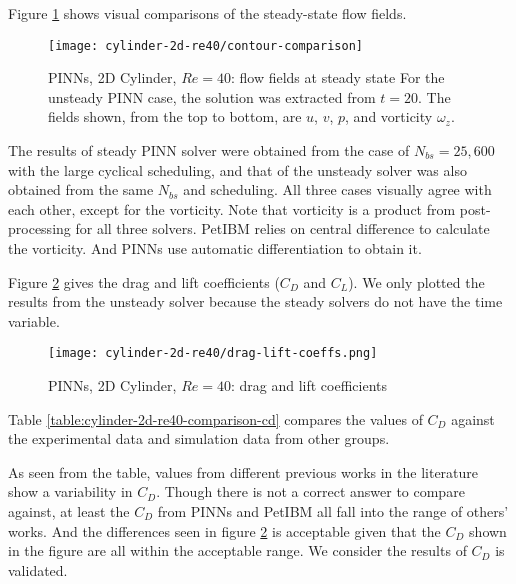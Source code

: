 Figure \ref{fig:cylinder-2d-re40-contours} shows visual comparisons of the steady-state flow fields.
\begin{figure}[hbt!]
    \texttt{[image: cylinder-2d-re40/contour-comparison]}
    \caption[
        PINNs, 2D Cylinder, $Re=40$: flow fields at steady state%
    ]{%
        PINNs, 2D Cylinder, $Re=40$: flow fields at steady state%
        For the unsteady PINN case, the solution was extracted from $t=20$.
        The fields shown, from the top to bottom, are $u$, $v$, $p$, and vorticity $\omega_z$.
    }%
    \label{fig:cylinder-2d-re40-contours}
\end{figure}
The results of steady PINN solver were obtained from the case of $N_{bs}=25,600$ with the large cyclical scheduling, and that of the unsteady solver was also obtained from the same $N_{bs}$ and scheduling.
All three cases visually agree with each other, except for the vorticity.
Note that vorticity is a product from post-processing for all three solvers.
PetIBM relies on central difference to calculate the vorticity.
And PINNs use automatic differentiation to obtain it.

Figure \ref{fig:cylinder-2d-re40-drag-lift-time} gives the drag and lift coefficients ($C_D$ and $C_L$).
We only plotted the results from the unsteady solver because the steady solvers do not have the time variable. 
\begin{figure}[hbt!]
    \texttt{[image: cylinder-2d-re40/drag-lift-coeffs.png]}
    \caption[
        PINNs, 2D Cylinder, $Re=40$: drag and lift coefficients%
    ]{%
        PINNs, 2D Cylinder, $Re=40$: drag and lift coefficients%
    }%
    \label{fig:cylinder-2d-re40-drag-lift-time}
\end{figure}
Table \ref{table:cylinder-2d-re40-comparison-cd} compares the values of $C_D$ against the experimental data and simulation data from other groups.

As seen from the table, values from different previous works in the literature show a variability in $C_D$.
Though there is not a correct answer to compare against, at least the $C_D$ from PINNs and PetIBM all fall into the range of others' works.
And the differences seen in figure \ref{fig:cylinder-2d-re40-drag-lift-time} is acceptable given that the $C_D$ shown in the figure are all within the acceptable range.
We consider the results of $C_D$ is validated.

